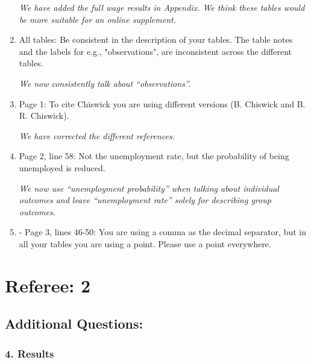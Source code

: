 \documentclass{article}
\newcommand{\debug}[1]{\marginpar{\small\raggedright\begin{spacing}{1}
      \color{BrickRed} #1
\end{spacing}
}}
\newenvironment{response}
{\slshape}{}
\begin{document}
\begin{enumerate}
  \begin{response}
    We have added the full wage results in Appendix.  We think these
    tables would be more suitable for an online supplement.
  \end{response}
\item All tables: Be consistent in the description of your tables. The
table notes and the labels for e.g., "observations", are inconsistent
across the different tables. 

\begin{response}
  We now consistently talk about ``observations''.
\end{response}

\item Page 1: To cite Chiswick you are using different versions
(B. Chiswick and B. R. Chiswick).

\begin{response}
  We have corrected the different references.
\end{response}

\item Page 2, line 58: Not the unemployment rate, but the probability of
  being unemployed is reduced.

  \begin{response}
    We now use ``unemployment probability'' when talking about
    individual outcomes and leave ``unemployment rate'' solely for
    describing group outcomes.
  \end{response}

\item 
- Page 3, lines 46-50: You are using a comma as the decimal separator, but in all your tables you are using a point. Please use a point everywhere. 
\debug{SKB: Fixed by someone.}
\end{enumerate}



\section{Referee: 2}


\subsection{Additional Questions:}

\subsubsection*{4. Results}
\end{document}
